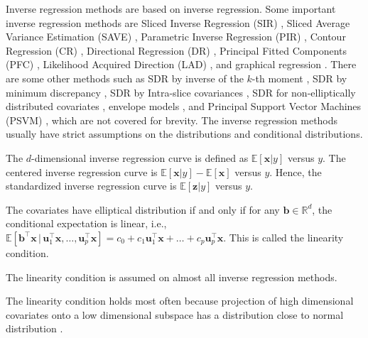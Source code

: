 \documentclass[lang=cn,10pt]{gorgeousnbook}
\numberwithin{equation}{section}%
\numberwithin{figure}{section}%
\begin{document}
Inverse regression methods are based on inverse regression. Some important inverse regression methods are Sliced Inverse Regression (SIR) \cite{li1991sliced}, Sliced Average Variance Estimation (SAVE) \cite{cook1991sliced,cook2000save}, Parametric Inverse Regression (PIR) \cite{bura2001estimating}, Contour Regression (CR) \cite{li2005contour}, Directional Regression (DR) \cite{li2007directional}, Principal Fitted Components (PFC) \cite{cook2007fisher,cook2008principal}, Likelihood Acquired Direction (LAD) \cite{cook2009likelihood}, and graphical regression \cite{cook1998regression,cook1998regressionPaper}. There are some other methods such as SDR by inverse of the $k$-th moment \cite{yin2003estimating}, SDR by minimum discrepancy \cite{cook2005sufficient}, SDR by Intra-slice covariances \cite{cook2006using}, SDR for non-elliptically distributed covariates \cite{li2009dimension}, envelope models \cite{cook2010envelope}, and Principal Support Vector Machines (PSVM) \cite{li2011principal}, which are not covered for brevity. 
The inverse regression methods usually have strict assumptions on the distributions and conditional distributions. 

\begin{definition}
The $d$-dimensional inverse regression curve is defined as
$\mathbb{E}[\boldsymbol{x} | y]$ versus $y$. The centered inverse regression curve is $\mathbb{E}[\boldsymbol{x} | y] - \mathbb{E}[\boldsymbol{x}]$ versus $y$. 
Hence, the standardized inverse regression curve is
$\mathbb{E}[\boldsymbol{z} | y]$ versus $y$.
\end{definition}

\begin{lemma}\label{lemma_linearity_condition}
The covariates have elliptical distribution if and only if for any $\boldsymbol{b} \in \mathbb{R}^d$, the conditional expectation is linear, i.e., $\mathbb{E}[\boldsymbol{b}^\top \boldsymbol{x}\, |\, \boldsymbol{u}_1^\top \boldsymbol{x}, \dots, \boldsymbol{u}_p^\top \boldsymbol{x}] = c_0 + c_1 \boldsymbol{u}_1^\top \boldsymbol{x} + \dots + c_p \boldsymbol{u}_p^\top \boldsymbol{x}$. This is called the linearity condition. 
\end{lemma}

The linearity condition is assumed on almost all inverse regression methods. 

\begin{remark}
The linearity condition holds most often \cite{li1991sliced} because projection of high dimensional covariates onto a low dimensional subspace has a distribution close to normal distribution \cite{diaconis1984asymptotics,hall1993almost}.
\end{remark}
\end{document}
